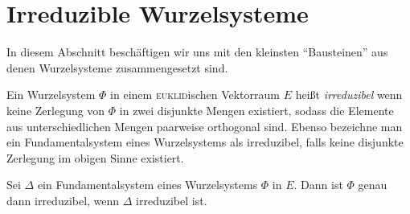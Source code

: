 \section{Irreduzible Wurzelsysteme}

In diesem Abschnitt beschäftigen wir uns mit den kleinsten ``Bausteinen'' aus denen Wurzelsysteme zusammengesetzt sind.

\begin{defn}
  Ein Wurzelsystem $\Phi$ in einem \textsc{euklid}ischen Vektorraum $E$ heißt \emph{irreduzibel} wenn keine Zerlegung von $\Phi$ in zwei disjunkte Mengen existiert, sodass die Elemente aus unterschiedlichen Mengen paarweise orthogonal sind.
  Ebenso bezeichne man ein Fundamentalsystem eines Wurzelsystems als irreduzibel, falls keine disjunkte Zerlegung im obigen Sinne existiert.
\end{defn}

\begin{lem}
  Sei $\Delta$ ein Fundamentalsystem eines Wurzelsystems $\Phi$ in $E$.
  Dann ist $\Phi$ genau dann irreduzibel, wenn $\Delta$ irreduzibel ist.
\end{lem}

